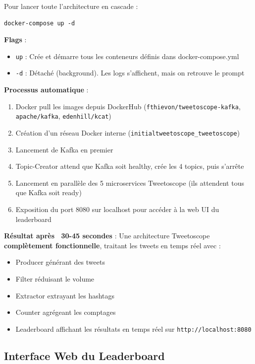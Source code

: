 \documentclass[10pt,a4paper]{article}
\begin{document}
Pour lancer toute l'architecture en cascade :

\begin{verbatim}
docker-compose up -d
\end{verbatim}

\textbf{Flags} :
\begin{itemize}
    \item \texttt{up} : Crée et démarre tous les conteneurs définis dans docker-compose.yml
    \item \texttt{-d} : Détaché (background). Les logs s'affichent, mais on retrouve le prompt
\end{itemize}

\textbf{Processus automatique} :
\begin{enumerate}
    \item Docker pull les images depuis DockerHub (\texttt{fthievon/tweetoscope-kafka}, \texttt{apache/kafka}, \texttt{edenhill/kcat})
    \item Création d'un réseau Docker interne (\texttt{initialtweetoscope\_tweetoscope})
    \item Lancement de Kafka en premier
    \item Topic-Creator attend que Kafka soit healthy, crée les 4 topics, puis s'arrête
    \item Lancement en parallèle des 5 microservices Tweetoscope (ils attendent tous que Kafka soit ready)
    \item Exposition du port 8080 sur localhost pour accéder à la web UI du leaderboard
\end{enumerate}

\textbf{Résultat après ~30-45 secondes} : Une architecture Tweetoscope \textbf{complètement fonctionnelle}, traitant les tweets en temps réel avec :
\begin{itemize}
    \item Producer générant des tweets
    \item Filter réduisant le volume
    \item Extractor extrayant les hashtags
    \item Counter agrégeant les comptages
    \item Leaderboard affichant les résultats en temps réel sur \texttt{http://localhost:8080}
\end{itemize}

\subsection{Interface Web du Leaderboard}
\end{document}
